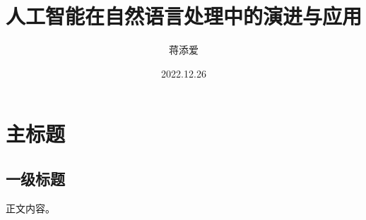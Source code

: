 \documentclass[12pt, a4paper, oneside]{article}
\title{人工智能在自然语言处理中的演进与应用}
\author{蒋添爱}
\date{2022.12.26}
\begin{document}
\maketitle
\section{主标题}
\subsection{一级标题}
正文内容。
\end{document}
